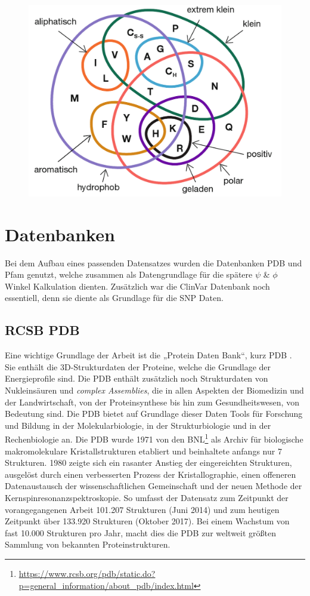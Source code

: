 \begin{figure}[]
    \centering
    \includegraphics[width=.70\textwidth]{images/amino_venn_diagramm.png}
    \label{fig:amino_venn}
\end{figure}


\newpage
\section{Datenbanken}
Bei dem Aufbau eines passenden Datensatzes wurden die Datenbanken \ac{PDB} und \ac{Pfam} genutzt, welche zusammen als Datengrundlage für die spätere $\psi$ \& $\phi$ Winkel Kalkulation dienten. Zusätzlich war die ClinVar Datenbank noch essentiell, denn sie diente als Grundlage für die \ac{SNP} Daten.


\subsection{RCSB PDB}

Eine wichtige Grundlage der Arbeit ist die „Protein Daten Bank“, kurz PDB \cite{Bernstein.1977}. Sie enthält die 3D-Strukturdaten der Proteine, welche die Grundlage der Energieprofile sind. Die \ac{PDB} enthält zusätzlich noch Strukturdaten von Nukleinsäuren und \emph{complex Assemblies}\cite{Kim.2009}, die in allen Aspekten der Biomedizin und der Landwirtschaft, von der Proteinsynthese bis hin zum Gesundheitswesen, von Bedeutung sind. Die \ac{PDB} bietet auf Grundlage dieser Daten Tools für Forschung und Bildung in der Molekularbiologie, in der Strukturbiologie und in der Rechenbiologie an.
Die \ac{PDB} wurde 1971 von den \ac{BNL}\footnote{\url{https://www.rcsb.org/pdb/static.do?p=general_information/about_pdb/index.html}} als Archiv für biologische makromolekulare Kristallstrukturen etabliert und beinhaltete anfangs nur 7 Strukturen. 1980 zeigte sich ein rasanter Anstieg der eingereichten Strukturen, ausgelöst durch einen verbesserten Prozess der Kristallographie, einen offeneren Datenaustausch der wissenschaftlichen Gemeinschaft und der neuen Methode der Kernspinresonanzspektroskopie. So umfasst der Datensatz zum Zeitpunkt der vorangegangenen Arbeit 101.207 Strukturen (Juni 2014) und zum heutigen Zeitpunkt über 133.920 Strukturen (Oktober 2017). Bei einem Wachstum von fast 10.000 Strukturen pro Jahr, macht dies die \ac{PDB} zur weltweit größten Sammlung von bekannten Proteinstrukturen.

